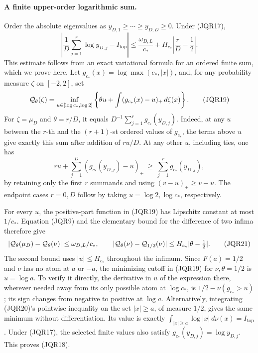 \documentclass[11pt,a4paper]{article}
\begin{document}
\paragraph{A finite upper-order logarithmic sum.}
Order the absolute eigenvalues as
\(y_{D,1}\geq\cdots\geq y_{D,D}\geq0\).
Under (JQR17),
\[
 \left|\frac1D\sum_{j=1}^r\log y_{D,j}-I_{\mathrm{top}}\right|
 \leq \frac{\omega_{D,L}}{c_*}
       +H_{c_*}\left|\frac rD-\frac12\right|.
 \tag{JQR18}
\]
This estimate follows from an exact variational formula for an ordered
finite sum, which we prove here.  Let
\(g_{c_*}(x)=\log\max(c_*,|x|)\), and, for any probability measure \(\zeta\)
on \([-2,2]\), set
\[
 {\cal Q}_\theta(\zeta)
 =\inf_{u\in[\log c_*,\log2]}
       \left\{\theta u+\int(g_{c_*}(x)-u)_+\,d\zeta(x)\right\}.
 \tag{JQR19}
\]
For \(\zeta=\mu_D\) and \(\theta=r/D\), it equals
\(D^{-1}\sum_{j=1}^r g_{c_*}(y_{D,j})\).
Indeed, at any \(u\) between the \(r\)-th and the \((r+1)\)-st
ordered values of \(g_{c_*}\), the terms above \(u\) give exactly this
sum after addition of \(ru/D\).  At any other \(u\), including ties,
one has
\[
 ru+\sum_{j=1}^D(g_{c_*}(y_{D,j})-u)_+
 \ \geq\ \sum_{j=1}^r g_{c_*}(y_{D,j}),
 \tag{JQR20}
\]
by retaining only the first \(r\) summands and using
\((v-u)_+\geq v-u\).  The endpoint cases \(r=0,D\) follow by
taking \(u=\log2,\log c_*\), respectively.

For every \(u\), the positive-part function in (JQR19) has Lipschitz
constant at most \(1/c_*\).  Equation (JQR9) and the elementary bound
for the difference of two infima therefore give
\[
 |{\cal Q}_\theta(\mu_D)-{\cal Q}_\theta(\nu)|
       \leq\omega_{D,L}/c_*,\qquad
 |{\cal Q}_\theta(\nu)-{\cal Q}_{1/2}(\nu)|
       \leq H_{c_*}|\theta-\tfrac12|.
 \tag{JQR21}
\]
The second bound uses \(|u|\leq H_{c_*}\) throughout the infimum.
Since \(F(a)=1/2\) and \(\nu\) has no atom at \(a\) or \(-a\),
the minimizing cutoff in (JQR19) for \(\nu,\theta=1/2\) is
\(u=\log a\).  To verify it directly, the derivative in \(u\) of
the expression there, wherever needed away from its only possible
atom at \(\log c_*\), is
\(1/2-\nu(g_{c_*}>u)\); its sign changes from negative to positive
at \(\log a\).  Alternatively, integrating (JQR20)'s pointwise
inequality on the set \(|x|\geq a\), of measure \(1/2\), gives the
same minimum without differentiation.  Its value is exactly
\(\int_{|x|\geq a}\log|x|\,d\nu(x)=I_{\mathrm{top}}\).
Under (JQR17), the selected finite values also satisfy
\(g_{c_*}(y_{D,j})=\log y_{D,j}\).  This proves (JQR18).
\end{document}
